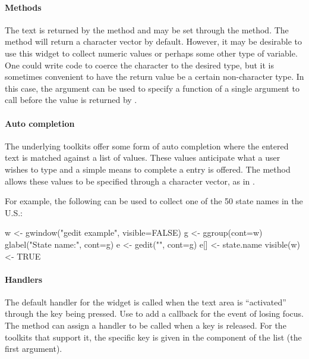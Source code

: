 \paragraph{Methods}
The text is returned by the  method and may be
set through the  method.  The
 method will return a character vector by
default. However, it may be desirable to use this widget to collect
numeric values or perhaps some other type of variable. One could write
code to coerce the character to the desired type, but it is sometimes
convenient to have the return value be a certain non-character
type. In this case, the  argument can be
used to specify a function of a single argument to call before the
value is returned by .

\paragraph{Auto completion}
The underlying toolkits offer some form of auto completion where the
entered text is matched against a list of values. These values
anticipate what a user wishes to type and a simple means to complete a
entry is offered. The \method{[\ASSIGN}{gedit} method allows these
values to be specified through a character vector, as in .

For example, the following can be used to collect one of the 50 state
names in the U.S.:
\begin{Schunk}
\begin{Sinput}
 w <- gwindow("gedit example", visible=FALSE) 
 g <- ggroup(cont=w)
 glabel("State name:", cont=g)
 e <- gedit("", cont=g)
 e[] <- state.name
 visible(w) <- TRUE
\end{Sinput}
\end{Schunk}

\paragraph{Handlers}
The default handler for the  widget is called when
the text area is ``activated'' through the
 key being pressed. Use  to add a
callback for the event of losing focus. The
 method can assign a handler to be
called when a key is released. For the toolkits that support it, the
specific key is given in the  component of the list  (the first argument).

